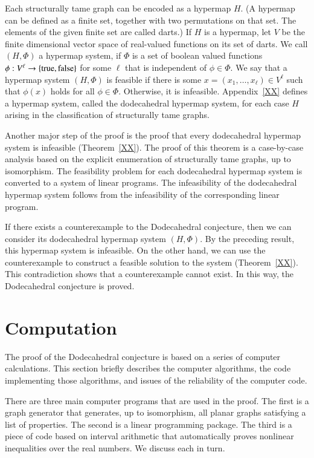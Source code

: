 Each structurally tame graph can be encoded as a hypermap $H$.  (A hypermap can be defined
as a finite set, together with two permutations on that set.  The elements
of the given finite set are called darts.)  If $H$ is a hypermap,
let $V$ be the finite dimensional
vector space of real-valued functions on its set of darts.
We call $(H,\Phi)$ a hypermap system, if $\Phi$ is a set of boolean
valued functions $\phi:V^\ell \to \{{\operatorname{true}},{\operatorname{false}}\}$ for
some $\ell$ that is independent of $\phi\in\Phi$.  We say that
a hypermap system $(H,\Phi)$ 
is feasible if there is some $x=(x_1,\ldots,x_\ell)\in V^\ell$
such that $\phi(x)$ holds for all $\phi\in\Phi$.  Otherwise,
it is infeasible.   Appendix~\ref{XX} defines
a hypermap system, called the dodecahedral hypermap system, 
for each case $H$ arising in the classification of
structurally tame graphs.

Another major step of the proof is the proof that every dodecahedral hypermap
system is infeasible (Theorem~\ref{XX}).   The proof of this theorem
is a case-by-case analysis based on the explicit enumeration of
structurally tame graphs, up to isomorphism.   The feasibility problem for 
each dodecahedral hypermap system is converted to a system of linear programs.
The infeasibility of the dodecahedral hypermap system follows from the
infeasibility of the corresponding linear program.

If there exists a counterexample to the Dodecahedral conjecture, then
we can consider its dodecahedral hypermap system $(H,\Phi)$.  By the preceding
result, this hypermap system is infeasible.  On the other hand, we can
use the counterexample to construct a feasible solution to the system 
(Theorem~\ref{XX}).
This contradiction shows that a counterexample cannot exist.
In this way, the Dodecahedral conjecture is proved.







\section{Computation}

The proof of the Dodecahedral conjecture is based on a series
of computer calculations.  This section briefly describes the
computer algorithms, the code implementing those algorithms,
and issues of the reliability of the computer code.

There are three main computer programs that are used in the proof.
The first is a graph generator that generates, up to isomorphism,
 all planar graphs satisfying a list of properties.  The second is
a linear programming package.  The third is a piece of code based
on interval arithmetic that
automatically proves nonlinear inequalities over the real numbers.
We discuss each in turn.  

